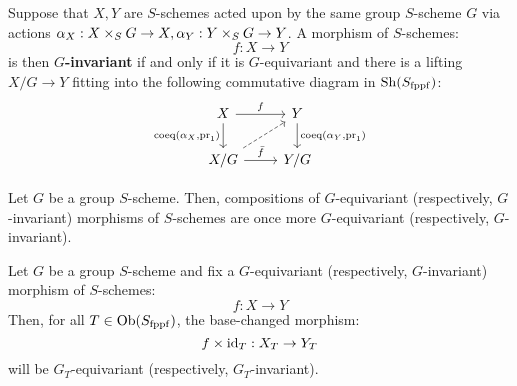         \begin{definition} \label{def: invariant_morphisms}
            Suppose that $X, Y$ are $S$-schemes acted upon by the same group $S$-scheme $G$ via actions $\alpha_X: X \x_S G \to X, \alpha_Y: Y \x_S G \to Y$. A morphism of $S$-schemes:
                $$f: X \to Y$$
            is then \textbf{$G$-invariant} if and only if it is $G$-equivariant and there is a lifting $X/G \to Y$ fitting into the following commutative diagram in $\mathrm{Sh}(S_{\mathrm{fppf}})$:
                $$
                    \begin{tikzcd}
                	X & Y \\
                	{X/G} & {Y/G}
                	\arrow["{\coeq(\alpha_X, \pr_1)}"', from=1-1, to=2-1]
                	\arrow["{\bar{f}}", from=2-1, to=2-2]
                	\arrow["f", from=1-1, to=1-2]
                	\arrow["{\coeq(\alpha_Y, \pr_1)}", from=1-2, to=2-2]
                	\arrow[dashed, from=2-1, to=1-2]
                    \end{tikzcd}
                $$
        \end{definition}
        \begin{proposition} \label{prop: compositions_of_equivariant_and_of_invariant_morphisms}
            Let $G$ be a group $S$-scheme. Then, compositions of $G$-equivariant (respectively, $G$-invariant) morphisms of $S$-schemes are once more $G$-equivariant (respectively, $G$-invariant).
        \end{proposition}
        \begin{proposition} \label{prop: base_changes_of_equivariant_and_of_invariant_morphisms}
            Let $G$ be a group $S$-scheme and fix a $G$-equivariant (respectively, $G$-invariant) morphism of $S$-schemes:
                $$f: X \to Y$$
            Then, for all $T \in \mathrm{Ob}(S_{\mathrm{fppf}})$, the base-changed morphism:
                $$f \x \id_T: X_T \to Y_T$$
            will be $G_T$-equivariant (respectively, $G_T$-invariant). 
        \end{proposition}

